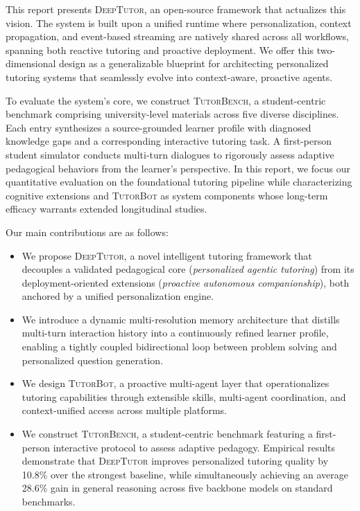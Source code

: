 This report presents \textsc{DeepTutor}, an open-source framework that actualizes this vision. The system is built upon a unified runtime where personalization, context propagation, and event-based streaming are natively shared across all workflows, spanning both reactive tutoring and proactive deployment. We offer this two-dimensional design as a generalizable blueprint for architecting personalized tutoring systems that seamlessly evolve into context-aware, proactive agents.

To evaluate the system’s core, we construct \textsc{TutorBench}, a student-centric benchmark comprising university-level materials across five diverse disciplines. Each entry synthesizes a source-grounded learner profile with diagnosed knowledge gaps and a corresponding interactive tutoring task. A first-person student simulator conducts multi-turn dialogues to rigorously assess adaptive pedagogical behaviors from the learner's perspective. 
In this report, we focus our quantitative evaluation on the foundational tutoring pipeline while characterizing cognitive extensions and \textsc{TutorBot} as system components whose long-term efficacy warrants extended longitudinal studies.

Our main contributions are as follows:
\begin{itemize}[nosep,leftmargin=*]
\item We propose \textsc{DeepTutor}, a novel intelligent tutoring framework that decouples a validated pedagogical core (\emph{personalized agentic tutoring}) from its deployment-oriented extensions (\emph{proactive autonomous companionship}), both anchored by a unified personalization engine.
\item We introduce a dynamic multi-resolution memory architecture that distills multi-turn interaction history into a continuously refined learner profile, enabling a tightly coupled bidirectional loop between problem solving and personalized question generation.
\item We design \textsc{TutorBot}, a proactive multi-agent layer that operationalizes tutoring capabilities through extensible skills, multi-agent coordination, and context-unified access across multiple platforms.
\item We construct \textsc{TutorBench}, a student-centric benchmark featuring a first-person interactive protocol to assess adaptive pedagogy. Empirical results demonstrate that \textsc{DeepTutor} improves personalized tutoring quality by 10.8\% over the strongest baseline, while simultaneously achieving an average 28.6\% gain in general reasoning across five backbone models on standard benchmarks.
\end{itemize}